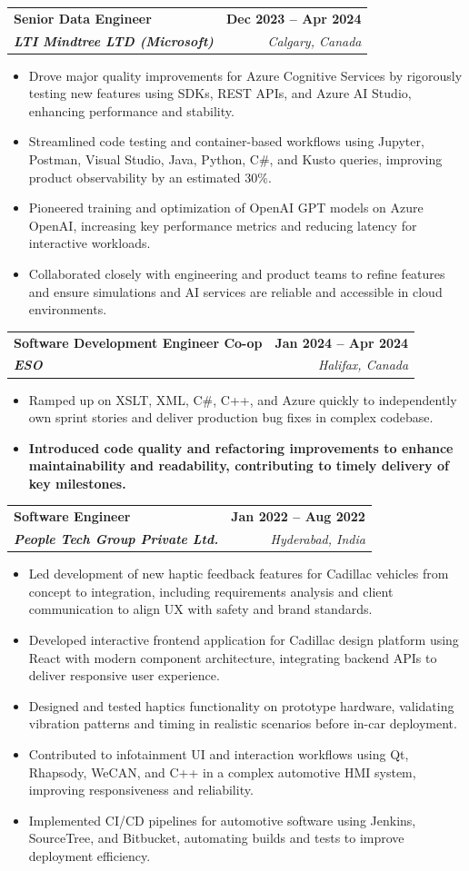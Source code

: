 \documentclass[letterpaper,11pt]{article}
\makeatletter
\newcommand{\resumeItem}[1]{
  \item\small{
    {#1 \vspace{-2pt}}
  }
}
\newcommand{\resumeSubheading}[4]{
  \vspace{-2pt}\item
    \begin{tabular*}{1.0\textwidth}[t]{l@{\extracolsep{\fill}}r}
      \textbf{#1} & \textbf{\small #2} \\
      \textit{\small#3} & \textit{\small #4} \\
    \end{tabular*}\vspace{-7pt}
}
\newcommand{\resumeItemListStart}{\begin{itemize}}
\newcommand{\resumeItemListEnd}{\end{itemize}\vspace{-5pt}}
\makeatother
\begin{document}
    \resumeSubheading
      {\textbf{Senior Data Engineer}}{\textbf{Dec 2023 -- Apr 2024}}
      {\textbf{LTI Mindtree LTD (Microsoft)}}{Calgary, Canada}
      \resumeItemListStart
        \resumeItem{Drove major quality improvements for Azure Cognitive Services by rigorously testing new features using SDKs, REST APIs, and Azure AI Studio, enhancing performance and stability.}
        \resumeItem{Streamlined code testing and container-based workflows using Jupyter, Postman, Visual Studio, Java, Python, C\#, and Kusto queries, improving product observability by an estimated 30\%.}
        \resumeItem{Pioneered training and optimization of OpenAI GPT models on Azure OpenAI, increasing key performance metrics and reducing latency for interactive workloads.}
        \resumeItem{Collaborated closely with engineering and product teams to refine features and ensure simulations and AI services are reliable and accessible in cloud environments.}
      \resumeItemListEnd
    
    \resumeSubheading
      {\textbf{Software Development Engineer Co-op}}{\textbf{Jan 2024 -- Apr 2024}}
      {\textbf{ESO}}{Halifax, Canada}
      \resumeItemListStart
        \resumeItem{Ramped up on XSLT, XML, C\#, C++, and Azure quickly to independently own sprint stories and deliver production bug fixes in complex codebase.}
        \resumeItem{\textbf{Introduced code quality and refactoring improvements to enhance maintainability and readability, contributing to timely delivery of key milestones.}}
      \resumeItemListEnd

    \resumeSubheading
      {\textbf{Software Engineer}}{\textbf{Jan 2022 -- Aug 2022}}
      {\textbf{People Tech Group Private Ltd.}}{Hyderabad, India}
      \resumeItemListStart
        \resumeItem{Led development of new haptic feedback features for Cadillac vehicles from concept to integration, including requirements analysis and client communication to align UX with safety and brand standards.}
        \resumeItem{Developed interactive frontend application for Cadillac design platform using React with modern component architecture, integrating backend APIs to deliver responsive user experience.}
        \resumeItem{Designed and tested haptics functionality on prototype hardware, validating vibration patterns and timing in realistic scenarios before in-car deployment.}
        \resumeItem{Contributed to infotainment UI and interaction workflows using Qt, Rhapsody, WeCAN, and C++ in a complex automotive HMI system, improving responsiveness and reliability.}
        \resumeItem{Implemented CI/CD pipelines for automotive software using Jenkins, SourceTree, and Bitbucket, automating builds and tests to improve deployment efficiency.}
      \resumeItemListEnd
\end{document}
